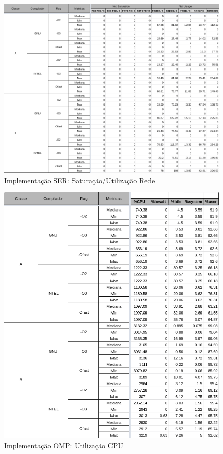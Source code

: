 \documentclass{article}
\begin{document}
\begin{appendices}
\begin{figure}[H]
    \centering
    \includegraphics[width=12cm]{Pictures/FT_r641_SER_NET.png}
    \caption{Implementação SER: Saturação/Utilização Rede}
    \label{figure:FT_r641_SER_NT}
\end{figure}



\begin{figure}[H]
    \centering
    \includegraphics[width=12cm]{Pictures/FT_r641_OMP_CPU.png}
    \caption{Implementação OMP: Utilização CPU}
    \label{figure:FT_r641_OMP_CPU}
\end{figure}


\end{appendices}
\end{document}
